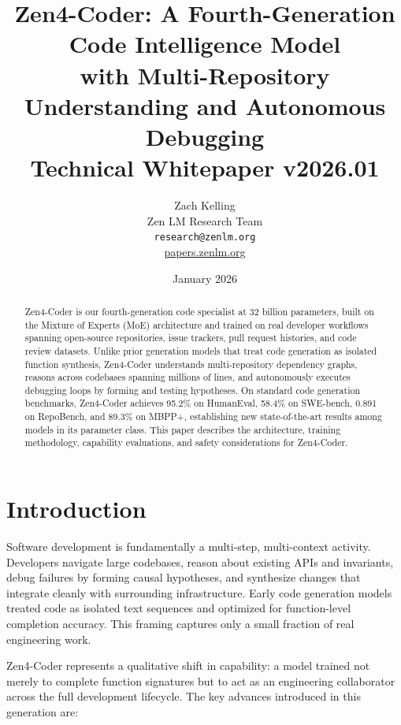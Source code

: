 \documentclass[11pt,a4paper]{article}
\title{\textbf{Zen4-Coder: A Fourth-Generation Code Intelligence Model\\
with Multi-Repository Understanding and Autonomous Debugging}\\[0.5em]
\large Technical Whitepaper v2026.01}
\author{Zach Kelling \\ Zen LM Research Team\\
\texttt{research@zenlm.org}\\
\href{https://papers.zenlm.org}{papers.zenlm.org}}
\date{January 2026}
\begin{document}
\maketitle

\begin{abstract}
Zen4-Coder is our fourth-generation code specialist at 32 billion parameters, built on the Mixture of Experts (MoE) architecture and trained on real developer workflows spanning open-source repositories, issue trackers, pull request histories, and code review datasets. Unlike prior generation models that treat code generation as isolated function synthesis, Zen4-Coder understands multi-repository dependency graphs, reasons across codebases spanning millions of lines, and autonomously executes debugging loops by forming and testing hypotheses. On standard code generation benchmarks, Zen4-Coder achieves 95.2\% on HumanEval, 58.4\% on SWE-bench, 0.891 on RepoBench, and 89.3\% on MBPP+, establishing new state-of-the-art results among models in its parameter class. This paper describes the architecture, training methodology, capability evaluations, and safety considerations for Zen4-Coder.
\end{abstract}

\tableofcontents
\newpage

\section{Introduction}

Software development is fundamentally a multi-step, multi-context activity. Developers navigate large codebases, reason about existing APIs and invariants, debug failures by forming causal hypotheses, and synthesize changes that integrate cleanly with surrounding infrastructure. Early code generation models treated code as isolated text sequences and optimized for function-level completion accuracy. This framing captures only a small fraction of real engineering work.

Zen4-Coder represents a qualitative shift in capability: a model trained not merely to complete function signatures but to act as an engineering collaborator across the full development lifecycle. The key advances introduced in this generation are:
\end{document}
